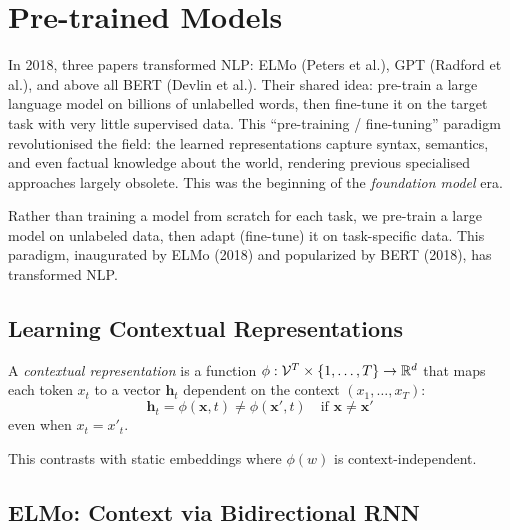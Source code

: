 \chapter{Pre-trained Models}
\label{ch:pretrained}

In 2018, three papers transformed NLP: ELMo (Peters et al.), GPT (Radford et al.), and above all BERT (Devlin et al.). Their shared idea: pre-train a large language model on billions of unlabelled words, then fine-tune it on the target task with very little supervised data. This ``pre-training / fine-tuning'' paradigm revolutionised the field: the learned representations capture syntax, semantics, and even factual knowledge about the world, rendering previous specialised approaches largely obsolete. This was the beginning of the \emph{foundation model} era.

\begin{intuition}[title=\textbf{The pre-training / fine-tuning paradigm}]
Rather than training a model from scratch for each task, we pre-train a large
model on unlabeled data, then adapt (fine-tune) it on task-specific data. This
paradigm, inaugurated by ELMo (2018) and popularized by BERT (2018), has
transformed NLP.
\end{intuition}

\section{Learning Contextual Representations}
\label{sec:pre:contextual}

\begin{definition}
A \emph{contextual representation} is a function
$\phi : \mathcal{V}^T \times \{1, \ldots, T\} \to \mathbb{R}^d$ that maps each token
$x_t$ to a vector $\mathbf{h}_t$ dependent on the context
$(x_1, \ldots, x_T)$:
\[
\mathbf{h}_t = \phi(\mathbf{x}, t) \neq \phi(\mathbf{x}', t) \quad \text{if } \mathbf{x} \neq \mathbf{x}'
\]
even when $x_t = x'_t$.
\end{definition}

This contrasts with static embeddings where $\phi(w)$ is context-independent.

\section{ELMo: Context via Bidirectional RNN}
\label{sec:pre:elmo}

